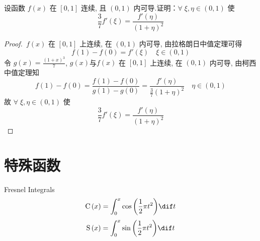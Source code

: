 \documentclass[color=green,titlestyle=hang]{elegantbook}%
\begin{document}
\begin{example}
设函数 $f(x)$ 在 $[0,1]$ 连续, 且 $(0,1)$ 内可导.证明：$\forall\;\xi,\eta\in(0,1)$ 使 \[\frac{3}{7}f'(\xi)=\frac{f'(\eta)}{(1+\eta)^2}\]
\end{example}\begin{proof}
\,$f(x)$ 在 $[0,1]$ 上连续,  在 $(0,1)$ 内可导, 由拉格朗日中值定理可得
\[f(1)-f(0)=f'(\xi)\quad\xi\in(0,1)\]
令 $g(x)=\frac{(1+x)^3}{7}$,  $g(x)$与$f(x)$ 在 $[0,1]$ 上连续,  在 $(0,1)$ 内可导, 由柯西中值定理知  \[f(1)-f(0)=\frac{f(1)-f(0)}{g(1)-g(0)}=\frac{f'(\eta)}{\frac{3}{7}(1+\eta)^2}\quad\eta\in(0,1)\]
故 $\forall\;\xi,\eta\in(0,1)$ 使 \[\frac{3}{7}f'(\xi)=\frac{f'(\eta)}{(1+\eta)^2}\]	
\end{proof}

\chapter{特殊函数}

%

\begin{newdef}[菲涅尔积分函数]
Fresnel Integrals\[{\rm C}\left( x \right) = \int_0^x {\cos \left( {\frac{1}{2}\pi {t^2}} \right)} \dif t\]
\[{\rm S}\left( x \right) = \int_0^x {\sin \left( {\frac{1}{2}\pi {t^2}} \right)} \dif t\]
\end{newdef}
\end{document}
